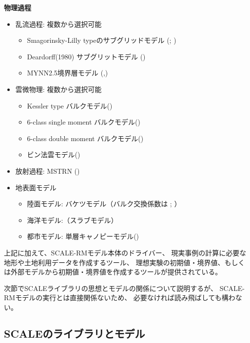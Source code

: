 {\bf 物理過程}
\begin{itemize}
 \item 乱流過程: 複数から選択可能
   \begin{itemize}
    \item Smagorinsky-Lilly typeのサブグリッドモデル (\cite{smagorinsky_1963}; \cite{lilly_1962})
    \item Deardorff(1980) サブグリットモデル (\cite{Deardorff_1980})
    \item MYNN2.5境界層モデル (\cite{my_1982},\cite{nakanishi_2004})
   \end{itemize}
 \item 雲微物理: 複数から選択可能
   \begin{itemize}
    \item Kessler type バルクモデル(\cite{kessler_1969})
    \item 6-class single moment バルクモデル(\cite{tomita_2008})
    \item 6-class double moment バルクモデル(\cite{sn_2014})
    \item ビン法雲モデル(\cite{suzuki_etal_2010})
   \end{itemize}
 \item 放射過程: MSTRN (\cite{sekiguchi_2008})
 \item 地表面モデル
  \begin{itemize}
   \item 陸面モデル: バケツモデル（バルク交換係数は \cite{beljaars_1991}; \cite{wilson_2001}）
   \item 海洋モデル:（スラブモデル）
   \item 都市モデル: 単層キャノピーモデル(\cite{kusaka_2001})
  \end{itemize}
\end{itemize}

上記に加えて、SCALE-RMモデル本体のドライバー、
現実事例の計算に必要な地形や土地利用データを作成するツール、
理想実験の初期値・境界値、もしくは外部モデルから初期値・境界値を作成するツールが提供されている。

次節でSCALEライブラリの思想とモデルの関係について説明するが、
SCALE-RMモデルの実行とは直接関係ないため、
必要なければ読み飛ばしても構わない。


\subsection{SCALEのライブラリとモデル}

